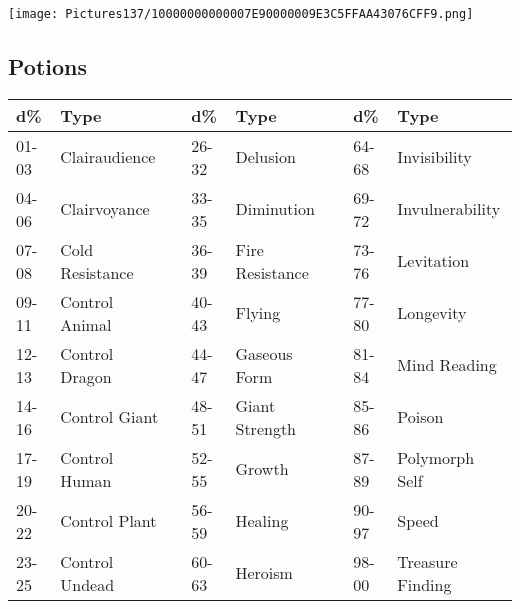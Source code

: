 \documentclass[a4paper,twoside,openany,10pt]{book}
\begin{document}
\vfill

 \texttt{[image: Pictures137/10000000000007E90000009E3C5FFAA43076CFF9.png]}  

\pagebreak

\subsection{Potions}\label{potions}

\begin{tabular*}{1\linewidth}{@{\extracolsep{\fill}}llllllll}
\textbf{d\%} & \textbf{Type} & & \textbf{d\%} & \textbf{Type} & & \textbf{d\%} & \textbf{Type} \\\toprule
01-03 & Clairaudience & & 26-32 & Delusion & & 64-68 & Invisibility \\\hline
04-06 & Clairvoyance & & 33-35 & Diminution & & 69-72 &
Invulnerability \\\hline
07-08 & Cold Resistance & & 36-39 & Fire Resistance & & 73-76 &
Levitation \\\hline
09-11 & Control Animal & & 40-43 & Flying & & 77-80 & Longevity \\\hline
12-13 & Control Dragon & & 44-47 & Gaseous Form & & 81-84 & Mind
Reading \\\hline
14-16 & Control Giant & & 48-51 & Giant Strength & & 85-86 & Poison \\\hline
17-19 & Control Human & & 52-55 & Growth & & 87-89 & Polymorph Self \\\hline
20-22 & Control Plant & & 56-59 & Healing & & 90-97 & Speed \\\hline
23-25 & Control Undead & & 60-63 & Heroism & & 98-00 & Treasure
Finding \\\bottomrule
\end{tabular*}
\end{document}
